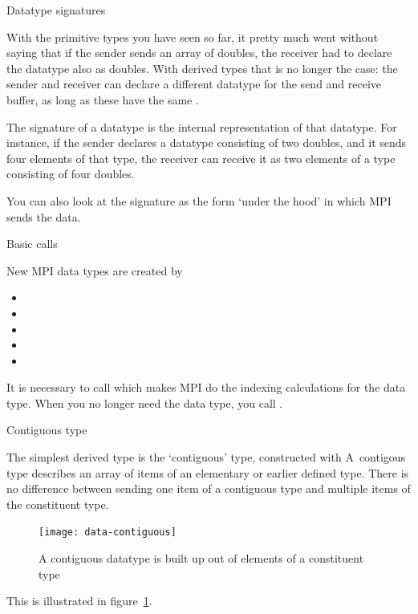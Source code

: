  {Datatype signatures}
\label{sec:signature}

With the primitive types you have seen so far, it pretty much went
without saying that if the sender sends an array of doubles, the
receiver had to declare the datatype also as doubles. With derived
types that is no longer the case: the sender and receiver can declare
a different datatype for the send and receive buffer, as long as these
have the same .

The signature of a datatype is the internal representation of that
datatype. For instance, if the sender declares a datatype consisting
of two doubles, and it sends four elements of that type, the receiver
can receive it as two elements of a type consisting of four doubles.

You can also look at the signature as the form `under the hood' in which MPI
sends the data.


 {Basic calls}

New MPI data types are created by
\begin{itemize}
\item {}
\item {}
\item {}
\item {}
\item {}
\end{itemize}
It is necessary to call  which makes MPI
do the indexing calculations for the data type.  When you no longer
need the data type, you call .

 {Contiguous type}

The simplest derived type is the `contiguous' type,
constructed with 
A~contigous type describes an array of items
of an elementary or earlier defined type. There is no difference between sending
one item of a contiguous type and multiple items of the constituent type.
\begin{figure}[ht]
  \texttt{[image: data-contiguous]}
  \caption{A contiguous datatype is built up out of elements of a constituent type}
  \label{fig:data-contiguous}
\end{figure}
This is illustrated in figure~\ref{fig:data-contiguous}.

